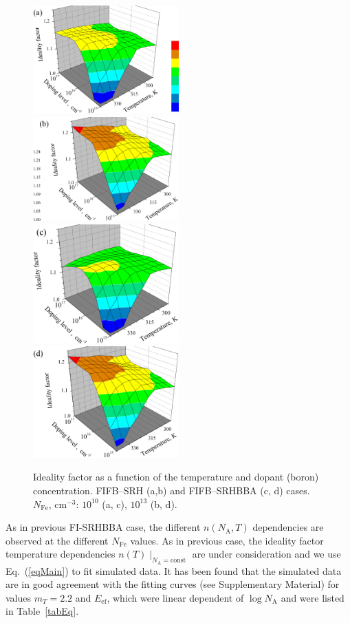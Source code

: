 \documentclass [sort&compress] {elsarticle}
\begin{document}
\begin{figure}
\includegraphics[width=0.5\textwidth]{Fig8a}%
\includegraphics[width=0.5\textwidth]{Fig8b}
\includegraphics[width=0.5\textwidth]{Fig8c}
\includegraphics[width=0.5\textwidth]{Fig8d}
\caption{\label{fig8}
Ideality factor as a function of the temperature and dopant (boron) concentration.
FIFB--SRH (a,b) and FIFB--SRHBBA (c, d) cases.
$N_\mathrm{Fe}$, cm$^{-3}$: $10^{10}$ (a, c), $10^{13}$ (b, d).
}%
\end{figure}

As in previous FI-SRHBBA case, the different $n(N_\mathrm{A}, T)$ dependencies are observed at the different $N_\mathrm{Fe}$ values.
As in previous case, the ideality factor temperature dependencies $n(T)\mid_{N_\mathrm{A}=\mathrm{const}}$ are under consideration
and we use Eq.~(\ref{eqMain}) to fit simulated data.
It has been found that the simulated data are in good agreement with the fitting curves (see Supplementary Material) for values
$m_T=2.2$ and $E_\mathrm{ef}$, which were linear dependent of $\log N_\mathrm{A}$ and were listed in Table~\ref{tabEq}.
\end{document}
